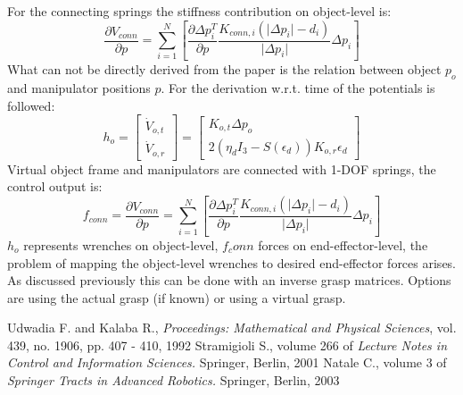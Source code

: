 \documentclass[conference]{IEEEtran}
\begin{document}
For the connecting springs the stiffness contribution on object-level is: 
\begin{equation}
\dfrac{\partial V_{conn}}{\partial p} = \sum_{i=1}^N\left[\dfrac{\partial\Delta p_i^T}{\partial p}\dfrac{K_{conn,i}(\vert\Delta p_i\vert - d_i)}{\vert\Delta p_i\vert}\Delta p_i\right] 
\end{equation}
What can not be directly derived from the paper is the relation between object $ p_o $ and manipulator positions $ p $.
For the derivation w.r.t. time of the potentials \cite{Natale2003} is followed: 
\begin{equation}
h_o = \begin{bmatrix}\dot{V}_{o,t} \\ \dot{V}_{o,r}\end{bmatrix} = \begin{bmatrix} K_{o,t}\Delta p_o\\2(\eta_d I_3 - S(\epsilon_d))K_{o,r}\epsilon_d\end{bmatrix}
\end{equation}
Virtual object frame and manipulators are connected with 1-DOF springs, the control output is:
\begin{equation}
f_{conn} = \dfrac{\partial V_{conn}}{\partial p} = \sum_{i=1}^N\left[\dfrac{\partial\Delta p_i^T}{\partial p}\dfrac{K_{conn,i}(\vert\Delta p_i\vert - d_i)}{\vert\Delta p_i\vert}\Delta p_i\right] 
\end{equation}
$ h_o $ represents wrenches on object-level, $ f_conn $ forces on end-effector-level, the problem of mapping the object-level wrenches to desired end-effector forces arises. As discussed previously this can be done with an inverse grasp matrices. Options are using the actual grasp (if known) or using a virtual grasp.  



%


\begin{thebibliography}{1}

Udwadia F. and Kalaba R.,
\newblock  \textit{Proceedings: Mathematical and Physical Sciences}, vol. 439, no. 1906, pp. 407 - 410, 1992
Stramigioli S.,
\newblock volume 266 of \textit{Lecture Notes in Control and Information Sciences.}
\newblock Springer, Berlin, 2001
Natale C.,
\newblock volume 3 of \textit{Springer Tracts in Advanced Robotics.}
\newblock Springer, Berlin, 2003



\end{thebibliography}




\end{document}
